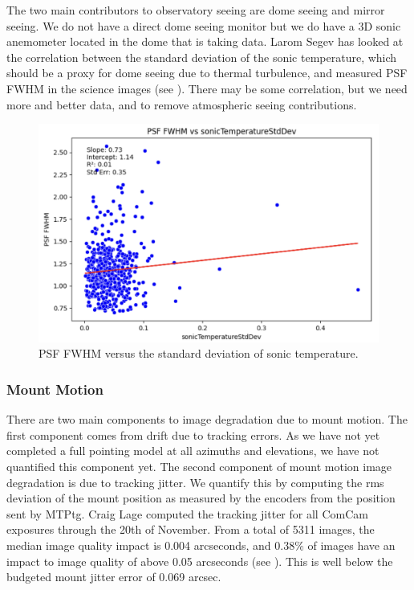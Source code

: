 The two main contributors to observatory seeing are dome seeing and mirror seeing. We do not have a direct dome seeing monitor but we do have a 3D sonic anemometer located in the dome that is taking data. Larom Segev has looked at the correlation between the standard deviation of the sonic temperature, which should be a proxy for dome seeing due to thermal turbulence, and measured PSF FWHM in the science images (see ). There may be some correlation, but we need more and better data, and to remove atmospheric seeing contributions.

\begin{figure}
    \includegraphics[width=\linewidth]{image_quality_figures/anemometer_PSF.png}
    \caption{PSF FWHM versus the standard deviation of sonic temperature.}
    \label{fig:anemometer}
\end{figure}

\subsubsection{Mount Motion}

There are two main components to image degradation due to mount motion. The first component comes from drift due to tracking errors. As we have not yet completed a full pointing model at all azimuths and elevations, we have not quantified this component yet. The second component of mount motion image degradation is due to tracking jitter. We quantify this by computing the rms deviation of the mount position as measured by the encoders from the position sent by MTPtg. Craig Lage computed the tracking jitter for all ComCam exposures through the 20th of November. From a total of 5311 images, the median image quality impact is 0.004 arcseconds, and 0.38\% of images have an impact to image quality of above 0.05 arcseconds (see ). This is well below the budgeted mount jitter error of 0.069 arcsec.

